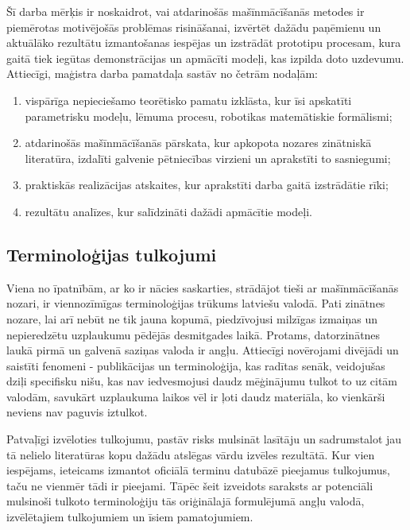 \documentclass[12pt, a4paper]{article}
\numberwithin{equation}{section} %
\begin{document}
Šī darba mērķis ir noskaidrot, vai atdarinošās mašīnmācīšanās metodes ir piemērotas motivējošās problēmas risināšanai, izvērtēt dažādu paņēmienu un aktuālāko rezultātu izmantošanas iespējas un izstrādāt prototipu procesam, kura gaitā tiek iegūtas demonstrācijas un apmācīti modeļi, kas izpilda doto uzdevumu. Attiecīgi, maģistra darba pamatdaļa sastāv no četrām nodaļām:
\begin{enumerate}
    \item vispārīga nepieciešamo teorētisko pamatu izklāsta, kur īsi apskatīti parametrisku modeļu, lēmuma procesu, robotikas matemātiskie formālismi;
    \item atdarinošās mašīnmācīšanās pārskata, kur apkopota nozares zinātniskā literatūra, izdalīti galvenie pētniecības virzieni un aprakstīti to sasniegumi;
    \item praktiskās realizācijas atskaites, kur aprakstīti darba gaitā izstrādātie rīki;
    \item rezultātu analīzes, kur salīdzināti dažādi apmācītie modeļi.
\end{enumerate}


\subsection*{Terminoloģijas tulkojumi} %

Viena no īpatnībām, ar ko ir nācies saskarties, strādājot tieši ar mašīnmācīšanās nozari, ir viennozīmīgas terminoloģijas trūkums latviešu valodā. Pati zinātnes nozare, lai arī nebūt ne tik jauna kopumā, piedzīvojusi milzīgas izmaiņas un nepieredzētu uzplaukumu pēdējās desmitgades laikā. Protams, datorzinātnes laukā pirmā un galvenā saziņas valoda ir angļu. Attiecīgi novērojami divējādi un saistīti fenomeni - publikācijas un terminoloģija, kas radītas senāk, veidojušas dziļi specifisku nišu, kas nav iedvesmojusi daudz mēģinājumu tulkot to uz citām valodām, savukārt uzplaukuma laikos vēl ir ļoti daudz materiāla, ko vienkārši neviens nav paguvis iztulkot.

Patvaļīgi izvēloties tulkojumu, pastāv risks mulsināt lasītāju un sadrumstalot jau tā nelielo literatūras kopu dažādu atslēgas vārdu izvēles rezultātā. Kur vien iespējams, ieteicams izmantot oficiālā terminu datubāzē pieejamus tulkojumus, taču ne vienmēr tādi ir pieejami. Tāpēc šeit izveidots saraksts ar potenciāli mulsinoši tulkoto terminoloģiju tās oriģinālajā formulējumā angļu valodā, izvēlētajiem tulkojumiem un īsiem pamatojumiem.  
\end{document}
